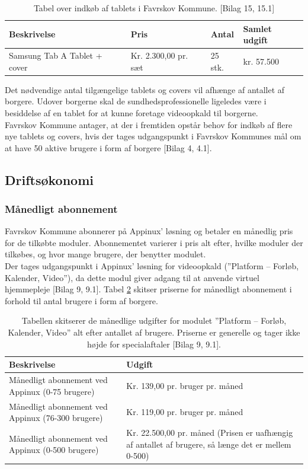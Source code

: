 \begin{table}[H]
	\caption{Tabel over indkøb af tablets i Favrskov Kommune. [Bilag 15, 15.1]}
	\centering
	\label{tab:tabelindkoeb}
	\begin{tabular}{|l|l|l|l|}
		\hline
		\textbf{Beskrivelse} & \textbf{Pris} & \textbf{Antal} & \textbf{Samlet udgift}\\ \hline
		Samsung Tab A Tablet + cover & Kr. 2.300,00 pr. sæt & 25 stk. & kr. 57.500\\ \hline
	\end{tabular}
\end{table}
Det nødvendige antal tilgængelige tablets og covers vil afhænge af antallet af borgere. Udover borgerne skal de sundhedsprofessionelle ligeledes være i besiddelse af en tablet for at kunne foretage videoopkald til borgerne. \\
Favrskov Kommune antager, at der i fremtiden opstår behov for indkøb af flere nye tablets og covers, hvis der tages udgangspunkt i Favrskov Kommunes mål om at have 50 aktive brugere i form af borgere [Bilag 4, 4.1].

\subsection{Driftsøkonomi}
\subsubsection{Månedligt abonnement}
Favrskov Kommune abonnerer på Appinux’ løsning og betaler en månedlig pris for de tilkøbte moduler. Abonnementet varierer i pris alt efter, hvilke moduler der tilkøbes, og hvor mange brugere, der benytter modulet. \\
Der tages udgangspunkt i Appinux’ løsning for videoopkald (”Platform – Forløb, Kalender, Video”), da dette modul giver adgang til at anvende virtuel hjemmepleje [Bilag 9, 9.1]. Tabel \ref{tab:tabelmaanedudgift} skitser priserne for månedligt abonnement i forhold til antal brugere i form af borgere. 

\begin{table}[H]
	\caption{Tabellen skitserer de månedlige udgifter for modulet ”Platform – Forløb, Kalender, Video” alt efter antallet af brugere. Priserne er generelle og tager ikke højde for specialaftaler [Bilag 9, 9.1].}
	\centering
	\label{tab:tabelmaanedudgift}
	\begin{tabularx}{\textwidth}{|X|X|}
		\hline
		\textbf{Beskrivelse} & \textbf{Udgift}\\ \hline
		Månedligt abonnement ved Appinux 
		(0-75 brugere)
		 & Kr. 139,00 pr. bruger pr. måned\\ 
		\hline
		Månedligt abonnement ved Appinux 
		(76-300 brugere)
		& Kr. 119,00 pr. bruger pr. måned\\ \hline
				Månedligt abonnement ved Appinux 
				(0-500 brugere)
				& Kr. 22.500,00 pr. måned (Prisen er uafhængig af antallet af brugere, så længe det er mellem 0-500)\\ \hline
	\end{tabularx}
\end{table}

